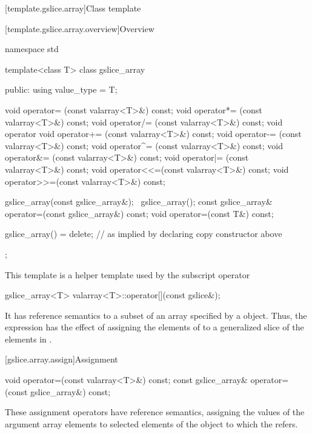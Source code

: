 [template.gslice.array]{Class template }

[template.gslice.array.overview]{Overview}

%
%
\begin{codeblock}
namespace std {
  template<class T> class gslice_array {
  public:
    using value_type = T;

    void operator=  (const valarray<T>&) const;
    void operator*= (const valarray<T>&) const;
    void operator/= (const valarray<T>&) const;
    void operator%
    void operator+= (const valarray<T>&) const;
    void operator-= (const valarray<T>&) const;
    void operator^= (const valarray<T>&) const;
    void operator&= (const valarray<T>&) const;
    void operator|= (const valarray<T>&) const;
    void operator<<=(const valarray<T>&) const;
    void operator>>=(const valarray<T>&) const;

    gslice_array(const gslice_array&);
    ~gslice_array();
    const gslice_array& operator=(const gslice_array&) const;
    void operator=(const T&) const;

    gslice_array() = delete;    // as implied by declaring copy constructor above
  };
}
\end{codeblock}

\pnum
This template is a helper template used by the
subscript operator

%
%
\begin{itemdecl}
gslice_array<T> valarray<T>::operator[](const gslice&);
\end{itemdecl}

\pnum
It has reference semantics to a subset of an array specified by a
object.
Thus, the expression
has the effect of assigning the elements of
to a
generalized slice of the elements in
.

[gslice.array.assign]{Assignment}

%
\begin{itemdecl}
void operator=(const valarray<T>&) const;
const gslice_array& operator=(const gslice_array&) const;
\end{itemdecl}

\begin{itemdescr}
\pnum
These assignment operators have reference semantics, assigning the values
of the argument array elements to selected elements of the
object to which the
refers.
\end{itemdescr}

